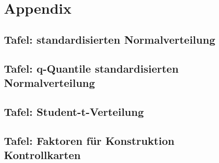 \newpage
\section{Appendix}
\subsection{Tafel: standardisierten Normalverteilung \cite{C:LookUpTable}}
\begin{minipage}{0.9\linewidth}
	\label{Anh:TafelStandardisierteNormalverteilung}
	
\end{minipage}
\newpage

\subsection{Tafel: q-Quantile standardisierten Normalverteilung \cite{C:LookUpTable}}
\begin{minipage}{0.9\linewidth}	
	\label{Anh:TafelqQuantileStandardisierteNormalverteilung}
	
\end{minipage}
\newpage

\subsection{Tafel: Student-t-Verteilung \cite{C:LookUpTable}}
\begin{minipage}{0.9\linewidth}
	\label{Anh:TafelStudentTVerteilung}
	
\end{minipage}
\newpage

\subsection{Tafel: Faktoren für Konstruktion Kontrollkarten \cite{C:KonstruktionKontrollkarte}}
\begin{minipage}{0.9\linewidth}
	\label{Anh:TafelFaktorenKontrollkarten}
	
\end{minipage}
\newpage

